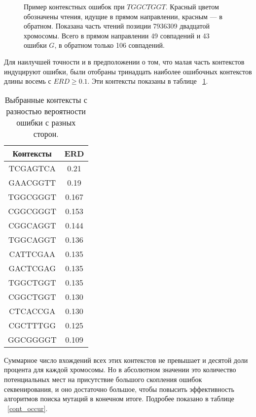 	\begin{figure}[h!]
	\caption{Пример контекстных ошибок при $TGGCTGGT$. Красный цветом обозначены чтения, идущие в прямом направлении, красным --- в обратном. Показана часть чтений позиции 7936309 двадцатой хромосомы. Всего в прямом направлении 49 совпадений и 43 ошибки $G$, в обратном только 106 совпадений.}
	\label{cont_error_example}
	\end{figure}

Для наилучшей точности и в предположении о том, что малая часть контекстов индуцируют ошибки, были отобраны тринадцать наиболее ошибочных контекстов длины восемь с $ERD \ge 0.1$. Эти контексты показаны в таблице ~\ref{chosen_cont}.

\begin{table}[H]
\begin{center}
\begin{tabular}{|c|c|}
\hline
Контексты & ERD \\
\hline
TCGAGTCA & 0.21 \\
\hline
GAACGGTT &  0.19 \\
\hline
TGGCGGGT &  0.167 \\
\hline
CGGCGGGT & 0.153 \\
\hline
CGGCAGGT & 0.144 \\
\hline
TGGCAGGT & 0.136 \\
\hline
CATTCGAA &  0.135 \\
\hline
GACTCGAG &  0.135 \\
\hline
TGGCTGGT &  0.135 \\
\hline
CGGCTGGT & 0.130 \\
\hline
CTCACCGA & 0.130 \\
\hline
CGCTTTGG & 0.125 \\
\hline
GGCGGGGT & 0.109 \\
\hline
\end{tabular}
\end{center}
\captionsetup{justification=centering}
\caption{Выбранные контексты с разностью вероятности ошибки с разных сторон.}
\label{chosen_cont}
\end{table} 

Суммарное число вхождений всех этих контекстов не превышает и десятой доли процента для каждой хромосомы. Но в абсолютном значении это количество потенциальных мест на присутствие большого скопления ошибок секвенирования, и оно достаточно большое, чтобы повысить эффективность алгоритмов поиска мутаций в конечном итоге. Подробее показано в таблице ~\ref{cont_occur}.

